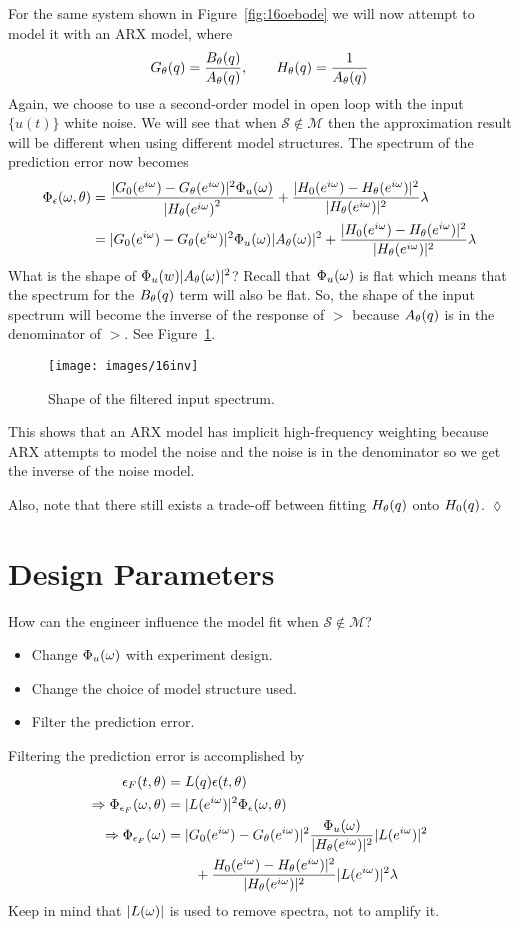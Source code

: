 \begin{example}
For the same system shown in Figure~\ref{fig:16oebode} we will now attempt to model it with an ARX model, where
$$G_\theta(q)=\frac{B_\theta(q)}{A_\theta(q)}, \qquad H_\theta(q)=\frac{1}{A_\theta(q)}$$
Again, we choose to use a second-order model in open loop with the input $\{u(t)\}$ white noise.
We will see that when $\mathcal{S}\notin\mathcal{M}$ then the approximation result will be different when using different model structures.
The spectrum of the prediction error now becomes
\begin{align*}
\Phi_\epsilon(\omega,\theta) &= \frac{|G_0(e^{i\omega})-G_\theta(e^{i\omega})|^2\Phi_u(\omega)}{|H_\theta{(e^{i\omega})}^2} + \frac{|H_0(e^{i\omega})-H_\theta(e^{i\omega})|^2}{|H_\theta(e^{i\omega})|^2}\lambda \\
&= |G_0(e^{i\omega})-G_\theta(e^{i\omega})|^2\Phi_u(\omega)|A_\theta(\omega)|^2 + \frac{|H_0(e^{i\omega})-H_\theta(e^{i\omega})|^2}{|H_\theta(e^{i\omega})|^2}\lambda
\end{align*}
What is the shape of $\Phi_u(w)|A_\theta(\omega)|^2$? Recall that $\Phi_u(\omega)$ is flat which means that the spectrum for the $B_\theta(q)$ term will also be flat.
So, the shape of the input spectrum will become the inverse of the response of $\gt$ because $A_\theta(q)$ is in the denominator of $\gt$.
See Figure~\ref{fig:16inv}.

\begin{figure}[ht!]
\centering
\texttt{[image: images/16inv]}
\caption{Shape of the filtered input spectrum.}
\label{fig:16inv}
\end{figure}

This shows that an ARX model has implicit high-frequency weighting because ARX attempts to model the noise and the noise is in the denominator so we get the inverse of the noise model.

Also, note that there still exists a trade-off between fitting $H_\theta(q)$ onto $H_0(q)$.
$\lozenge$
\end{example}

\section{Design Parameters}
\label{sec:16dp}
How can the engineer influence the model fit when $\mathcal{S}\notin\mathcal{M}$?
\begin{itemize}
\item Change $\Phi_u(\omega)$ with experiment design.
\item Change the choice of model structure used.
\item Filter the prediction error.
\end{itemize}
Filtering the prediction error is accomplished by
\begin{align*}
\epsilon_F(t,\theta) &= L(q)\epsilon(t,\theta) \\
\Rightarrow \Phi_{\epsilon_F}(\omega,\theta) &= |L(e^{i\omega})|^2\Phi_\epsilon(\omega,\theta) \\
\Rightarrow \Phi_{\epsilon_F}(\omega) &= |G_0(e^{i\omega}) - G_\theta(e^{i\omega})|^2\frac{\Phi_u(\omega)}{|H_\theta(e^{i\omega})|^2}|L(e^{i\omega})|^2 \\
&\qquad + \frac{H_0(e^{i\omega}) - H_\theta(e^{i\omega})|^2}{|H_\theta(e^{i\omega})|^2}|L(e^{i\omega})|^2\lambda
\end{align*}
Keep in mind that $|L(\omega)|$ is used to remove spectra, not to amplify it.

